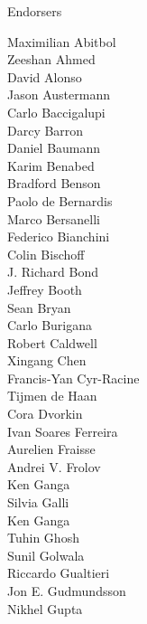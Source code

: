 \documentclass[PICOReport.tex]{subfiles}
\begin{document}
\Large { \centerline {Endorsers}}
%
\footnotesize {
\begin{multicols}{4}  
Maximilian Abitbol              \\
Zeeshan Ahmed                   \\
David Alonso                    \\
Jason Austermann                \\
Carlo Baccigalupi               \\
Darcy Barron                    \\
Daniel Baumann                  \\
Karim Benabed                   \\
Bradford Benson                 \\
Paolo de Bernardis              \\
Marco Bersanelli                \\
Federico Bianchini              \\
Colin Bischoff                  \\
J. Richard Bond                 \\
Jeffrey Booth                   \\
Sean Bryan                      \\
Carlo Burigana                  \\
Robert Caldwell                 \\
Xingang Chen                    \\
Francis-Yan Cyr-Racine          \\
Tijmen de Haan                  \\
Cora Dvorkin                    \\
Ivan Soares Ferreira            \\
Aurelien Fraisse                \\
Andrei V. Frolov                \\
Ken Ganga                       \\
Silvia Galli                    \\
Ken Ganga                       \\
Tuhin Ghosh                     \\
Sunil Golwala                   \\
Riccardo Gualtieri              \\
Jon E. Gudmundsson              \\
Nikhel Gupta                    \\

\end{multicols}}
\end{document}
